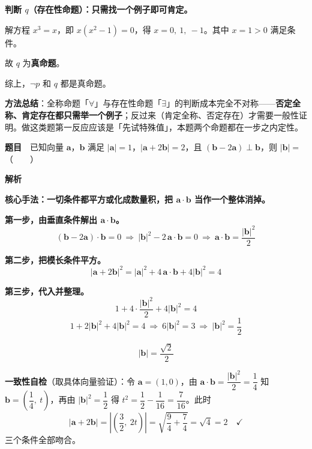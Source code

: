 \textbf{判断 $q$（存在性命题）：只需找一个例子即可肯定。}

解方程 $x^{3}=x$，即 $x\left(x^{2}-1\right)=0$，得 $x=0,\ 1,\ -1$。其中 $x=1>0$ 满足条件。

故 $q$ 为\textbf{真命题}。

综上，$\neg p$ 和 $q$ 都是真命题。


\begin{gktip}
\textbf{方法总结}：全称命题「$\forall$」与存在性命题「$\exists$」的判断成本完全不对称——\textbf{否定全称、肯定存在都只需举一个例子}；反过来（肯定全称、否定存在）才需要一般性证明。做这类题第一反应应该是「先试特殊值」，本题两个命题都在一步之内定性。
\end{gktip}

\par\medskip


\textbf{题目}　已知向量 $\boldsymbol a$，$\boldsymbol b$ 满足 $|\boldsymbol a|=1$，$|\boldsymbol a+2\boldsymbol b|=2$，且 $(\boldsymbol b-2\boldsymbol a)\perp\boldsymbol b$，则 $|\boldsymbol b|=$（　　）

\textbf{解析}

\textbf{核心手法：一切条件都平方或化成数量积，把 $\boldsymbol a\cdot\boldsymbol b$ 当作一个整体消掉。}

\textbf{第一步，由垂直条件解出 $\boldsymbol a\cdot\boldsymbol b$。}
\[(\boldsymbol b-2\boldsymbol a)\cdot\boldsymbol b=0\ \Longrightarrow\ |\boldsymbol b|^{2}-2\,\boldsymbol a\cdot\boldsymbol b=0\ \Longrightarrow\ \boldsymbol a\cdot\boldsymbol b=\frac{|\boldsymbol b|^{2}}2\]

\textbf{第二步，把模长条件平方。}
\[|\boldsymbol a+2\boldsymbol b|^{2}=|\boldsymbol a|^{2}+4\,\boldsymbol a\cdot\boldsymbol b+4|\boldsymbol b|^{2}=4\]

\textbf{第三步，代入并整理。}
\[1+4\cdot\frac{|\boldsymbol b|^{2}}2+4|\boldsymbol b|^{2}=4\]
\[1+2|\boldsymbol b|^{2}+4|\boldsymbol b|^{2}=4\ \Longrightarrow\ 6|\boldsymbol b|^{2}=3\ \Longrightarrow\ |\boldsymbol b|^{2}=\frac12\]

\[|\boldsymbol b|=\frac{\sqrt2}2\]


\begin{gktip}
\textbf{一致性自检}（取具体向量验证）：令 $\boldsymbol a=(1,0)$，由 $\boldsymbol a\cdot\boldsymbol b=\dfrac{|\boldsymbol b|^{2}}2=\dfrac14$ 知 $\boldsymbol b=\left(\dfrac14,\ t\right)$，再由 $|\boldsymbol b|^{2}=\dfrac12$ 得 $t^{2}=\dfrac12-\dfrac1{16}=\dfrac7{16}$。此时
\[|\boldsymbol a+2\boldsymbol b|=\left|\left(\frac32,\ 2t\right)\right|=\sqrt{\frac94+\frac74}=\sqrt4=2\quad\checkmark\]
三个条件全部吻合。
\end{gktip}

